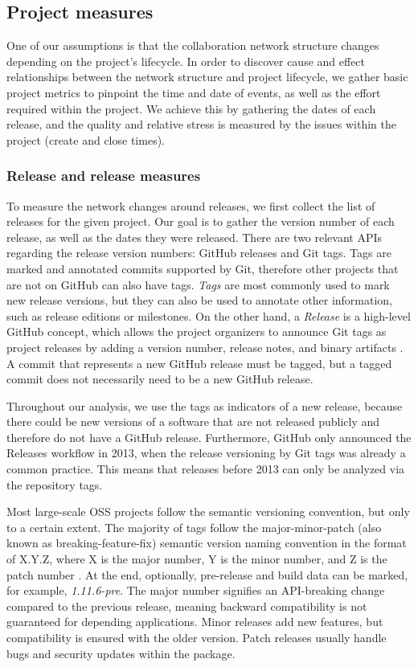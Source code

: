 \subsection{Project measures}

One of our assumptions is that the collaboration network structure changes depending on the project's lifecycle. In order to discover cause and effect relationships between the network structure and project lifecycle, we gather basic project metrics to pinpoint the time and date of events, as well as the effort required within the project. We achieve this by gathering the dates of each release, and the quality and relative stress is measured by the issues within the project (create and close times).

\subsubsection{Release and release measures}

To measure the network changes around releases, we first collect the list of releases for the given project. Our goal is to gather the version number of each release, as well as the dates they were released. There are two relevant APIs regarding the release version numbers: GitHub releases and Git tags. Tags are marked and annotated commits supported by Git, therefore other projects that are not on GitHub can also have tags. \textit{Tags} are most commonly used to mark new release versions, but they can also be used to annotate other information, such as release editions or milestones. On the other hand, a \textit{Release} is a high-level GitHub concept, which allows the project organizers to announce Git tags as project releases by adding a version number, release notes, and binary artifacts \cite{olsonReleaseYourSoftware2013}. A commit that represents a new GitHub release must be tagged, but a tagged commit does not necessarily need to be a new GitHub release.

Throughout our analysis, we use the tags as indicators of a new release, because there could be new versions of a software that are not released publicly and therefore do not have a GitHub release. Furthermore, GitHub only announced the Releases workflow in 2013, when the release versioning by Git tags was already a common practice. This means that releases before 2013 can only be analyzed via the repository tags.

Most large-scale OSS projects follow the semantic versioning convention, but only to a certain extent. The majority of tags follow the major-minor-patch (also known as breaking-feature-fix) semantic version naming convention in the format of X.Y.Z, where X is the major number, Y is the minor number, and Z is the patch number \cite{preston-wernerSemanticVersioning}. At the end, optionally, pre-release and build data can be marked, for example, \textit{1.11.6-pre}. The major number signifies an API-breaking change compared to the previous release, meaning backward compatibility is not guaranteed for depending applications. Minor releases add new features, but compatibility is ensured with the older version. Patch releases usually handle bugs and security updates within the package.

